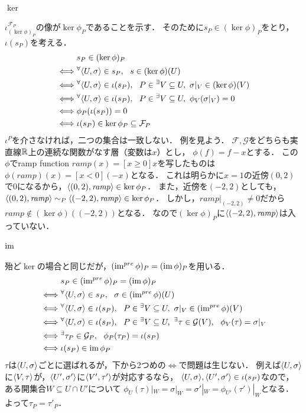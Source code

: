 \documentclass[a4paper]{jsarticle}
\newcommand{\shF}{\mathcal{F}}
\newcommand{\shG}{\mathcal{G}}
\begin{document}
    \paragraph{$\ker$}
    $\iota_{(\ker \phi)_P}^{\shF_P}$の像が$\ker \phi_P$であることを示す．
    そのために$s_P \in (\ker \phi)_P$をとり，$\iota(s_P)$を考える．
    \begin{align*}
        {}&     s_P \in (\ker \phi)_P \\
        \iff&   \Forall{\germ{U}{\sigma} \in s_P} s \in (\ker \phi)(U) \\
        \iff&   \Forall{\germ{U}{\sigma} \in \iota(s_P)} P \in {}^{\exists}{V} \subseteq U,~ \sigma|_V \in (\ker \phi)(V) \\
        \iff&   \Forall{\germ{U}{\sigma} \in \iota(s_P)} P \in {}^{\exists}{V} \subseteq U,~ \phi_V(\sigma|_V)=0 \\
        \iff&   \phi_P(\iota(s_P))=0 \\
        \iff&   \iota(s_P) \in \ker \phi_P \subseteq \shF_P
    \end{align*}
    $\iota^P$を介さなければ，二つの集合は一致しない．
    例を見よう．
    $\shF, \shG$をどちらも実直線$\mathbb{R}$上の連続な関数がなす層（変数は$x$）とし，
    $\phi(f)=f-x$とする．
    この$\phi$でramp function $\mathit{ramp}(x)=[x \geq 0]x$を写したものは
    $\phi(\mathit{ramp})(x)=[x<0](-x)$となる．
    これは明らかに$x=1$の近傍$(0,2)$で0になるから，$\langle (0,2),\mathit{ramp} \rangle \in \ker \phi_P$．
    また，近傍を$(-2,2)$としても，
    $\langle (0,2),\mathit{ramp} \rangle \sim_P \langle (-2,2),\mathit{ramp} \rangle \in \ker \phi_P$．
    しかし，$\mathit{ramp}|_{(-2,2)} \neq 0$だから
    $\mathit{ramp} \not \in (\ker \phi)((-2,2))$となる．
    なので$(\ker \phi)_P$に$\langle (-2,2),\mathit{ramp} \rangle$は入っていない．

    \paragraph{$\operatorname{im}$}
    殆ど$\ker$の場合と同じだが，$(\operatorname{im}^{pre} \phi)_P=(\operatorname{im} \phi)_P$を用いる．
    \begin{align*}
        {}&     s_P \in (\im^{pre} \phi)_P=(\im \phi)_P \\
        \iff&   \Forall{\germ{U}{\sigma} \in s_P} \sigma \in (\im^{pre} \phi)(U) \\
        \iff&   \Forall{\germ{U}{\sigma} \in \iota(s_P)} P \in {}^{\exists}{V} \subseteq U,~ \sigma|_V \in (\im^{pre} \phi)(V) \\
        \iff&   \Forall{\germ{U}{\sigma} \in \iota(s_P)} P \in {}^{\exists}{V} \subseteq U,~ \Exists{\tau \in \shG(V)} \phi_V(\tau)=\sigma|_V \\
        \iff&   \Exists{\tau_P \in \shG_P} \phi_P(\tau_P)=\iota(s_P) \\
        \iff&   \iota(s_P) \in \im \phi_P
    \end{align*}
    $\tau$は$\langle U,\sigma \rangle$ごとに選ばれるが，下から2つめの$\iff$で問題は生じない．
    例えば$\langle U,\sigma \rangle$に$\langle V,\tau \rangle$が，$\langle U',\sigma' \rangle$に$\langle V',\tau' \rangle$が対応するなら，
    $\langle U,\sigma \rangle, \langle U',\sigma' \rangle \in \iota(s_P)$なので，
    ある開集合$W \subseteq U \cap U'$について
    $\phi_{U}(\tau)|_W=\sigma|_{W}=\sigma'|_{W}=\phi_{U'}(\tau')|_W$となる．
    よって$\tau_P=\tau'_P$．
\end{document}

